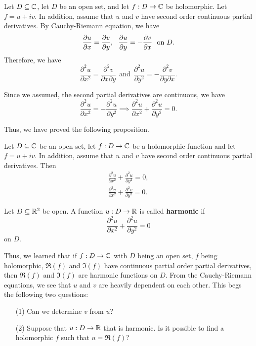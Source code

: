\documentclass[a4paper]{article}
\begin{document}
Let \( D \subseteq  \mathbb{C}  \), let \( D  \) be an open set, and let \( f: D \to \mathbb{C}  \) be holomorphic. Let \( f = u + iv \). In addition, assume that \( u \) and \( v  \) have second order continuous partial derivatives. By Cauchy-Riemann equation, we have
\[  \frac{\partial u }{\partial x }  = \frac{\partial v }{\partial y } , \ \ \frac{\partial u }{\partial y }  = - \frac{\partial v }{\partial x }  \ \ \text{on \( D  \)}. \]
Therefore, we have 
\[  \frac{\partial ^{2} u  }{\partial x^{2} }  = \frac{\partial ^{2} v  }{\partial x \partial y }  \ \ \text{and} \ \ \frac{\partial ^{2} u  }{\partial  y^{2} }  = - \frac{\partial ^{2}v  }{\partial y \partial x }. \]

Since we assumed, the second partial derivatives are continuous, we have 
\[  \frac{\partial ^{2} u  }{\partial x^{2} }  = - \frac{\partial ^{2} u  }{\partial  y^{2} }  \implies \frac{\partial ^{2} u  }{\partial  x^{2} }  + \frac{\partial ^{2} u  }{\partial  y^{2} }  = 0.  \]

Thus, we have proved the following proposition.

\begin{prop}
    Let \( D \subseteq  \mathbb{C}  \) be an open set, let \( f: D \to \mathbb{C}  \) be a holomorphic function and let \( f = u + i v \). In addition, assume that \( u  \) and \( v  \) have second order continuous partial derivatives. Then
    \begin{align*}
        \frac{\partial ^{2} u   }{\partial x^{2}  }  + \frac{\partial ^{2} u  }{\partial  y^{2} }  = 0, \\
        \frac{\partial ^{2} v  }{\partial x^{2}  }  + \frac{\partial ^{2} v  }{\partial  y^{2} }  = 0. 
    \end{align*}
\end{prop}

\begin{definition}
    Let \( D \subseteq  \mathbb{R}^{2} \) be open. A function \( u: D \to \mathbb{R}  \) is called \textbf{harmonic} if \[ \frac{\partial ^{2} u  }{\partial x^{2} }  + \frac{\partial ^{2} u  }{\partial y^{2} }   = 0  \] on \( D  \).
\end{definition}

Thus, we learned that if \( f: D \to \mathbb{C}  \) with \( D  \) being an open set, \( f  \) being holomorphic, \( \Re(f) \) and \( \Im(f) \) have continuous partial order partial derivatives, then \( \Re(f) \) and \( \Im(f) \) are harmonic functions on \( D  \). From the Cauchy-Riemann equations, we see that \( u  \) and \( v  \) are heavily dependent on each other. This begs the following two questions:
\begin{enumerate}
    \item[(1)] Can we determine \( v  \) from \( u \)?
    \item[(2)] Suppose that \( u : D \to \mathbb{R}  \) that is harmonic. Is it possible to find a holomorphic \( f  \) such that \( u = \Re(f) \)?
\end{enumerate}
\end{document}
